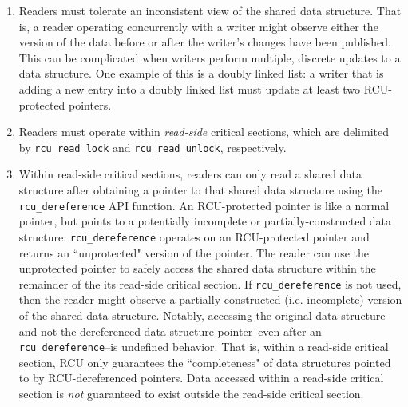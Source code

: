 \documentclass[preprint]{sigplanconf}
\begin{document}

\begin{enumerate}
	\item Readers must tolerate an inconsistent view of the shared data structure. That is, a reader operating concurrently with a writer might observe either the version of the data before or after the writer's changes have been published. This can be complicated when writers perform multiple, discrete updates to a data structure. One example of this is a doubly linked list: a writer that is adding a new entry into a doubly linked list must update at least two RCU-protected pointers.
	
	\item Readers must operate within \emph{read-side} critical sections, which are delimited by \texttt{rcu\_read\_lock} and \texttt{rcu\_read\_unlock}, respectively.
	
	\item Within read-side critical sections, readers can only read a shared data structure after obtaining a pointer to that shared data structure using the \texttt{rcu\_dereference} API function. An RCU-protected pointer is like a normal pointer, but points to a potentially incomplete or partially-constructed data structure. \texttt{rcu\_dereference} operates on an RCU-protected pointer and returns an ``unprotected" version of the pointer. The reader can use the unprotected pointer to safely access the shared data structure within the remainder of the its read-side critical section. If \texttt{rcu\_dereference} is not used, then the reader might observe a partially-constructed (i.e. incomplete) version of the shared data structure. Notably, accessing the original data structure and not the dereferenced data structure pointer--even after an \texttt{rcu\_dereference}--is undefined behavior. That is, within a read-side critical section, RCU only guarantees the ``completeness" of data structures pointed to by RCU-dereferenced pointers. Data accessed within a read-side critical section is \emph{not} guaranteed to exist outside the read-side critical section.


\end{enumerate}
\end{document}

